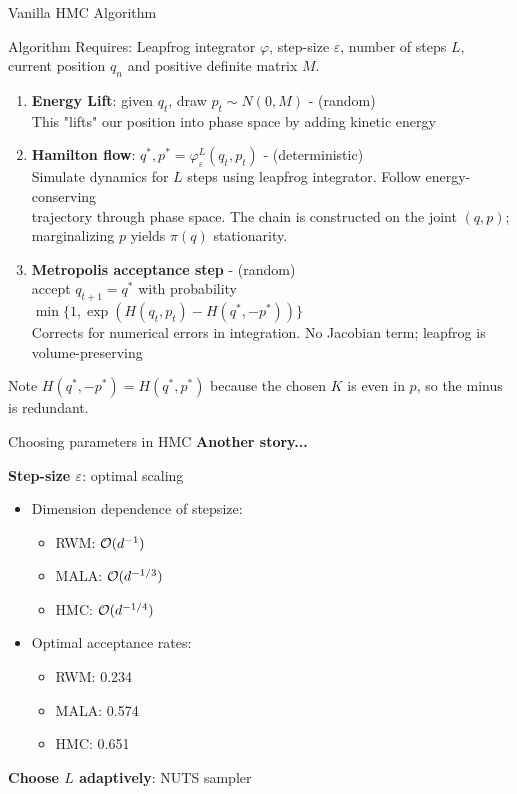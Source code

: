 \begin{frame}{Vanilla HMC Algorithm}

	\begin{block}{Algorithm}
		Requires: Leapfrog integrator $\varphi$, step-size $\varepsilon$, number of steps $L$, current position $q_n$
		and positive definite matrix $M$.

		\begin{enumerate}
			\item \textbf{Energy Lift}: given $q_t$, draw $p_t \sim N(0, M)$  - (random) \\
			      This "lifts" our position into phase space by adding kinetic energy

			\item \textbf{Hamilton flow}: $q^*, p^* = \varphi_{\varepsilon}^L(q_t, p_t)$ - (deterministic)\\
			      Simulate dynamics for $L$ steps using leapfrog integrator. Follow energy-conserving  \\
			      trajectory through phase space. The chain is constructed on the joint $(q, p)$;
			      marginalizing $p$ yields $\pi(q)$ stationarity.

			\item \textbf{Metropolis acceptance step} - (random) \\
			      accept $q_{t+1} = q^*$ with probability
			      $\min\Big\{1, \exp(H(q_t, p_t) - H(q^*, -p^*))\Big\}$ \\
			      Corrects for numerical errors in integration. No Jacobian term; leapfrog is volume-preserving
		\end{enumerate}
	\end{block}
	Note $H(q^*, -p^*) = H(q^*, p^*)$ because the chosen $K$ is even in $p$, so the minus is redundant.

\end{frame}

\begin{frame}{Choosing parameters in HMC}
	\textbf{Another story...}
	\vspace{0.5cm}

	\textbf{Step-size $\varepsilon$}: optimal scaling

	\begin{itemize}
		\item Dimension dependence of stepsize:
		      \begin{itemize}
			      \item RWM: $\mathcal{O}(d^{-1})$
			      \item MALA: $\mathcal{O}(d^{-1/3})$
			      \item HMC: $\mathcal{O}(d^{-1/4})$
		      \end{itemize}
		\item Optimal acceptance rates:
		      \begin{itemize}
			      \item RWM: 0.234
			      \item MALA: 0.574
			      \item HMC: 0.651
		      \end{itemize}
	\end{itemize}
	\vspace{0.5cm}
	\textbf{Choose $L$ adaptively}: NUTS sampler
\end{frame}
